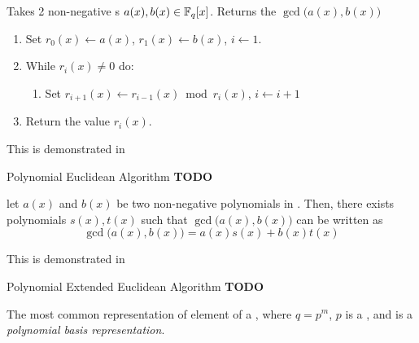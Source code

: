 \begin{definition}\label{def:Polynomial_Euclidean_Algorithm}
  Takes 2 non-negative s $a(x), b(x) \in \mathbb{F}_{q}[x]$.
  Returns the $\gcd \bigl( a(x), b(x) \bigr)$
  \begin{enumerate}[noitemsep]
  \item Set $r_{0}(x) \leftarrow a(x)$, $r_{1}(x) \leftarrow b(x)$, $i \leftarrow 1$.
  \item While $r_{i}(x) \neq 0$ do:
    \begin{enumerate}[noitemsep]
    \item Set $r_{i+1}(x) \leftarrow r_{i-1}(x) \bmod r_{i}(x)$, $i \leftarrow i + 1$
    \end{enumerate}
  \item Return the value $r_{i}(x)$.
  \end{enumerate}
  
  This is demonstrated in 
\end{definition}

\begin{example}[Lecture 3]{Polynomial Euclidean Algorithm}
  \textbf{TODO}
\end{example}

\begin{definition}\label{def:Polynomial_Extended_Euclidean_Algorithm}
  let $a(x)$ and $b(x)$ be two non-negative polynomials in .
  Then, there exists polynomials $s(x), t(x)$ such that $\gcd \bigl( a(x), b(x) \bigr)$ can be written as
  \begin{equation}\label{eq:Polynomial_Extended_Euclidean_Algorithm}
    \gcd \bigl( a(x), b(x) \bigr) = a(x) s(x) + b(x) t(x)
  \end{equation}

  This is demonstrated in 
\end{definition}

\begin{example}[Lecture 3]{Polynomial Extended Euclidean Algorithm}
  \textbf{TODO}
\end{example}

\begin{definition}
  The most common representation of element of a  , where $q = p^{m}$, $p$ is a , and is a \emph{polynomial basis representation}.
\end{definition}

